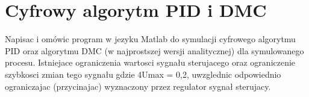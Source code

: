 \section{Cyfrowy algorytm PID i DMC}
Napisac i omówic program w jezyku Matlab do symulacji cyfrowego algorytmu PID
oraz algorytmu DMC (w najprostszej wersji analitycznej) dla symulowanego procesu.
Istniejace ograniczenia wartosci sygnału sterujacego oraz ograniczenie szybkosci zmian
tego sygnału
gdzie 4Umax = 0,2, uwzglednic odpowiednio ograniczajac (przycinajac) wyznaczony
przez regulator sygnał sterujacy.
